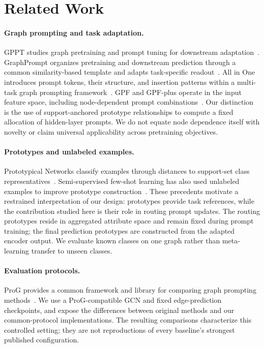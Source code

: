 \section{Related Work}
\paragraph{Graph prompting and task adaptation.}
GPPT studies graph pretraining and prompt tuning for downstream adaptation~\citep{gppt2022}. GraphPrompt organizes pretraining and downstream prediction through a common similarity-based template and adapts task-specific readout~\citep{graphprompt2023}. All in One introduces prompt tokens, their structure, and insertion patterns within a multi-task graph prompting framework~\citep{allinone2023}. GPF and GPF-plus operate in the input feature space, including node-dependent prompt combinations~\citep{gpf2023}. Our distinction is the use of support-anchored prototype relationships to compute a fixed allocation of hidden-layer prompts. We do not equate node dependence itself with novelty or claim universal applicability across pretraining objectives.

\paragraph{Prototypes and unlabeled examples.}
Prototypical Networks classify examples through distances to support-set class representatives~\citep{proto2017}. Semi-supervised few-shot learning has also used unlabeled examples to improve prototype construction~\citep{semiproto2018}. These precedents motivate a restrained interpretation of our design: prototypes provide task references, while the contribution studied here is their role in routing prompt updates. The routing prototypes reside in aggregated attribute space and remain fixed during prompt training; the final prediction prototypes are constructed from the adapted encoder output. We evaluate known classes on one graph rather than meta-learning transfer to unseen classes.

\paragraph{Evaluation protocols.}
ProG provides a common framework and library for comparing graph prompting methods~\citep{prog2024}. We use a ProG-compatible GCN and fixed edge-prediction checkpoints, and expose the differences between original methods and our common-protocol implementations. The resulting comparisons characterize this controlled setting; they are not reproductions of every baseline's strongest published configuration.

